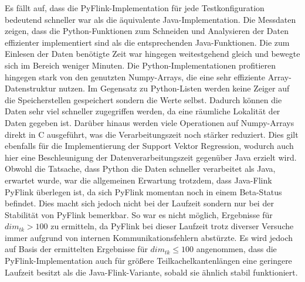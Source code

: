 Es fällt auf, dass die PyFlink-Implementation für jede Testkonfiguration bedeutend schneller war als die äquivalente Java-Implementation. Die Messdaten zeigen, dass die Python-Funktionen zum Schneiden und Analysieren der Daten effizienter implementiert sind als die entsprechenden Java-Funktionen. Die zum Einlesen der Daten benötigte Zeit war hingegen weitestgehend gleich und bewegte sich im Bereich weniger Minuten. Die Python-Implementationen profitieren hingegen stark von den genutzten Numpy-Arrays, die eine sehr effiziente Array-Datenstruktur nutzen. Im Gegensatz zu Python-Listen werden keine Zeiger auf die Speicherstellen gespeichert sondern die Werte selbst. Dadurch können die Daten sehr viel schneller zugegriffen werden, da eine räumliche Lokalität der Daten gegeben ist. Darüber hinaus werden viele Operationen auf Numpy-Arrays direkt in C ausgeführt, was die Verarbeitungszeit noch stärker reduziert. Dies gilt ebenfalls für die Implementierung der Support Vektor Regression, wodurch auch hier eine Beschleunigung der Datenverarbeitungszeit gegenüber Java erzielt wird. Obwohl die Tatsache, dass Python die Daten schneller verarbeitet als Java, erwartet wurde, war die allgemeinen Erwartung trotzdem, dass Java-Flink PyFlink überlegen ist, da sich PyFlink momentan noch in einem Beta-Status befindet. Dies macht sich jedoch nicht bei der Laufzeit sondern nur bei der Stabilität von PyFlink bemerkbar. So war es nicht möglich, Ergebnisse für $dim_{tk} > 100$ zu ermitteln, da PyFlink bei dieser Laufzeit trotz diverser Versuche immer aufgrund von internen Kommunikationsfehlern abstürzte. Es wird jedoch auf Basis der ermittelten Ergebnisse für $dim_{tk} \leq 100$ angenommen, dass die PyFlink-Implementation auch für größere Teilkachelkantenlängen eine geringere Laufzeit besitzt als die Java-Flink-Variante, sobald sie ähnlich stabil funktioniert.

